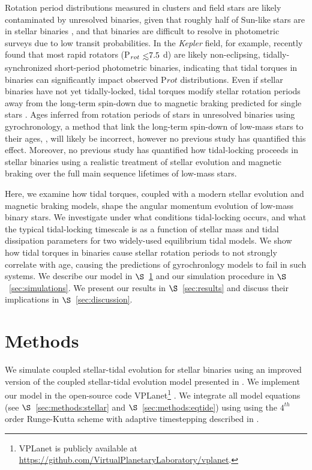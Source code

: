 \documentclass[twocolumn]{aastex61}
\def\lsim{~\rlap{$<$}{\lower 1.0ex\hbox{$\sim$}}}
\newcommand{\kepler}[0]{\textit{Kepler}\xspace}
\begin{document}
Rotation period distributions measured in clusters and field stars are likely contaminated by unresolved binaries, given that roughly half of Sun-like stars are in stellar binaries \citep{Raghavan2010,Duchene2013}, and that binaries are difficult to resolve in photometric surveys due to low transit probabilities. In the \kepler field, for example, \citet{Simonian2018} recently found that most rapid rotators (P$_{rot} \lsim 7.5$ d) are likely non-eclipsing, tidally-synchronized short-period photometric binaries, indicating that tidal torques in binaries can significantly impact observed P${rot}$ distributions.  Even if stellar binaries have not yet tidally-locked, tidal torques modify stellar rotation periods away from the long-term spin-down due to magnetic braking predicted for single stars \citep{Dunn1961,Skumanich1972,Barnes2003}. Ages inferred from rotation periods of stars in unresolved binaries using gyrochronology, a method that link the long-term spin-down of low-mass stars to their ages, \citep{Skumanich1972,Barnes2003,Barnes2007,Mamajek2008,Barnes2010}, will likely be incorrect, however no previous study has quantified this effect.  Moreover, no previous study has quantified how tidal-locking proceeds in stellar binaries using a realistic treatment of stellar evolution and magnetic braking over the full main sequence lifetimes of low-mass stars.


Here, we examine how tidal torques, coupled with a modern stellar evolution and magnetic braking models, shape the angular momentum evolution of low-mass binary stars.  We investigate under what conditions tidal-locking occurs, and what the typical tidal-locking timescale is as a function of stellar mass and tidal dissipation parameters for two widely-used equilibrium tidal models.  We show how tidal torques in binaries cause stellar rotation periods to not strongly correlate with age, causing the predictions of gyrochronlogy models to fail in such systems.  We describe our model in $\S$~\ref{sec:methods} and our simulation procedure in $\S$~\ref{sec:simulations}.  We present our results in $\S$~\ref{sec:results} and discuss their implications in $\S$~\ref{sec:discussion}.


\section{Methods} \label{sec:methods}

We simulate coupled stellar-tidal evolution for stellar binaries using an improved version of the coupled stellar-tidal evolution model presented in \citet{Fleming2018}.  We implement our model in the open-source code VPLanet\footnote{VPLanet is publicly available
at \href{https://github.com/VirtualPlanetaryLaboratory/vplanet}{{https://github.com/VirtualPlanetaryLaboratory/vplanet}}.} \citep[][Barnes et al., in prep]{Barnes2016,vplanet2018}.  We integrate all model equations (see $\S$~\ref{sec:methods:stellar} and $\S$~\ref{sec:methods:eqtide}) using using the $4^{th}$ order Runge-Kutta scheme with adaptive timestepping described in \citet{Fleming2018}.  
\end{document}

